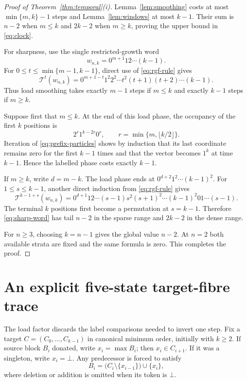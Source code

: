\documentclass[a4paper,10pt]{amsart}
\theoremstyle{definition}
\theoremstyle{remark}
\newcommand{\T}{\mathcal T}
\newcommand{\botstate}{\bot}
\begin{document}
\begin{proof}[Proof of Theorem~\ref{thm:temporal}(i)]
Lemma~\ref{lem:smoothing} costs at most $\min\{m,k\}-1$ steps and
Lemma~\ref{lem:windows} at most $k-1$.  Their sum is $n-2$ when $m\le k$
and $2k-2$ when $m\ge k$, proving the upper bound in \eqref{eq:clock}.

For sharpness, use the single restricted-growth word
\begin{equation}\label{eq:sharp-word}
 w_{n,k}=0^{m+1}12\cdots(k-1).
\end{equation}
For $0\le t\le\min\{m-1,k-1\}$, direct use of
\eqref{eq:rgf-rule} gives
\begin{equation}\label{eq:load-witness}
 \T^t(w_{n,k})=
 0^{m+1-t}1^2 2^2\cdots t^2(t+1)(t+2)\cdots(k-1).
\end{equation}
Thus load smoothing takes exactly $m-1$ steps if $m\le k$ and exactly
$k-1$ steps if $m\ge k$.

Suppose first that $m\le k$.  At the end of this load phase, the occupancy
of the first $k$ positions is
\[
 2^r1^{k-2r}0^r,\qquad r=\min\{m,\lfloor k/2\rfloor\}.
\]
Iteration of \eqref{eq:prefix-particles} shows by induction that its last
coordinate remains zero for the first $k-1$ times and that the vector becomes
$1^k$ at time $k-1$.  Hence the labelled phase costs exactly $k-1$.

If $m\ge k$, write $d=m-k$.  The load phase ends at
$0^{d+2}1^2\cdots(k-1)^2$.  For $1\le s\le k-1$, another direct induction
from \eqref{eq:rgf-rule} gives
\begin{equation}\label{eq:dense-witness}
 \T^{k-1+s}(w_{n,k})=
 0^{d+1}12\cdots(s-1)s^2(s+1)^2\cdots(k-1)^2
 01\cdots(s-1).
\end{equation}
The terminal $k$ positions first become a permutation at $s=k-1$.
Therefore \eqref{eq:sharp-word} has tail $n-2$ in the sparse range and
$2k-2$ in the dense range.

For $n\ge3$, choosing $k=n-1$ gives the global value $n-2$.  At $n=2$ both
available strata are fixed and the same formula is zero.  This completes the
proof.
\end{proof}

\section{An explicit five-state target-fibre trace}

The load factor discards the label comparisons needed to invert one step.
Fix a target $C=(C_0,\ldots,C_{k-1})$ in canonical minimum order, initially
with $k\ge2$.  If source block $B_i$ donated, write $x_i=\max B_i$; then
$x_i\in C_{i+1}$.  If it was a singleton, write $x_i=\botstate$.  Any
predecessor is forced to satisfy
\begin{equation}\label{eq:reconstruction}
 B_i=\bigl(C_i\setminus\{x_{i-1}\}\bigr)\cup\{x_i\},
\end{equation}
where deletion or addition is omitted when its token is $\botstate$.
\end{document}
